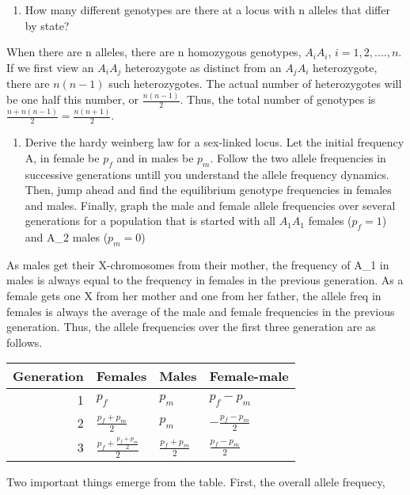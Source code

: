 \documentclass[nofonts,]{tufte-handout}
\providecommand{\tightlist}{%
  \setlength{\itemsep}{0pt}\setlength{\parskip}{0pt}}
\begin{document}
\begin{enumerate}
\def\labelenumi{\arabic{enumi}.}
\tightlist
\item
  How many different genotypes are there at a locus with n alleles that
  differ by state?
\end{enumerate}

When there are n alleles, there are n homozygous genotypes, \(A_iA_i\),
\(i = 1, 2, ...., n\). If we first view an \(A_iA_j\) heterozygote as
distinct from an \(A_jA_i\) heterozygote, there are \(n(n-1)\) such
heterozygotes. The actual number of heterozygotes will be one half this
number, or \(\frac{n(n-1)}{2}\). Thus, the total number of genotypes is
\(\frac{n+n(n-1)}{2}= \frac{n(n+1)}{2}\).

\begin{enumerate}
\def\labelenumi{\arabic{enumi}.}
\tightlist
\item
  Derive the hardy weinberg law for a sex-linked locus. Let the initial
  frequency A, in female be \(p_f\) and in males be \(p_m\). Follow the
  two allele frequencies in successive generations untill you understand
  the allele frequency dynamics. Then, jump ahead and find the
  equilibrium genotype frequencies in females and males. Finally, graph
  the male and female allele frequencies over several generations for a
  population that is started with all \(A_1A_1\) females (\(p_f = 1\))
  and A\_2 males (\(p_m = 0\))
\end{enumerate}

As males get their X-chromosomes from their mother, the frequency of
A\_1 in males is always equal to the frequency in females in the
previous generation. As a female gets one X from her mother and one from
her father, the allele freq in females is always the average of the male
and female frequencies in the previous generation. Thus, the allele
frequencies over the first three generation are as follows.

\begin{tabular}{rlll}
\toprule
Generation & Females & Males & Female-male\\
\midrule
1 & $p_f$ & $p_m$ & $p_f - p_m$\\
2 & $\frac{p_f + p_m}{2}$ & $p_m$ & $-\frac{p_f -p_m}{2}$\\
3 & $\frac{p_f + \frac{p_f + p_m}{2}}{2}$ & $\frac{p_f+ p_m}{2}$ & $\frac{p_f -p_m}{2}$\\
\bottomrule
\end{tabular}

Two important things emerge from the table. First, the overall allele
frequecy,
\end{document}
